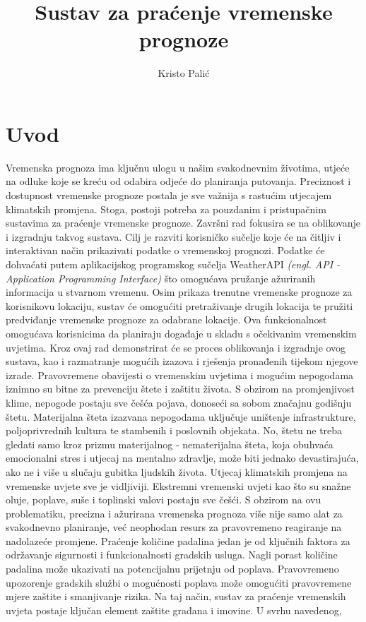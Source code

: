 \documentclass[times, utf8, zavrsni]{fer}
\begin{document}

\title{Sustav za praćenje vremenske prognoze}

\author{Kristo Palić}


\zahvala

\tableofcontents

\chapter{Uvod}
Vremenska prognoza ima ključnu ulogu u našim svakodnevnim životima, utjeće na odluke koje se kreću od odabira odjeće do planiranja putovanja. Preciznost i dostupnost vremenske prognoze postala je sve važnija s rastućim utjecajem klimatskih promjena. Stoga, postoji potreba za pouzdanim i pristupačnim sustavima za praćenje vremenske prognoze. Završni rad fokusira se na oblikovanje i izgradnju takvog sustava. Cilj je razviti korisničko sučelje koje će na čitljiv i interaktivan način prikazivati podatke o vremenskoj prognozi. Podatke će dohvaćati putem aplikacijskog programskog sučelja WeatherAPI \cite{weather_API} \textit{(engl. API - Application Programming Interface)} što omogućava pružanje ažuriranih informacija u stvarnom vremenu. Osim prikaza trenutne vremenske prognoze za korisnikovu lokaciju, sustav će omogućiti pretraživanje drugih lokacija te pružiti predviđanje vremenske prognoze za odabrane lokacije. Ova funkcionalnost omogućava korisnicima da planiraju događaje u skladu s očekivanim vremenskim uvjetima. Kroz ovaj rad demonstrirat će se proces oblikovanja i izgradnje ovog sustava, kao i razmatranje mogućih izazova i rješenja pronađenih tijekom njegove izrade. Pravovremene obavijesti o vremenskim uvjetima i mogućim nepogodama iznimno su bitne za prevenciju štete i zaštitu života. S obzirom na promjenjivost klime, nepogode postaju sve češća pojava, donoseći sa sobom značajnu godišnju štetu. Materijalna šteta izazvana nepogodama uključuje uništenje infrastrukture, poljoprivrednih kultura te stambenih i poslovnih objekata. No, štetu ne treba gledati samo kroz prizmu materijalnog - nematerijalna šteta, koja obuhvaća emocionalni stres i utjecaj na mentalno zdravlje, može biti jednako devastirajuća, ako ne i više u slučaju gubitka ljudskih života. Utjecaj klimatskih promjena na vremenske uvjete sve je vidljiviji. Ekstremni vremenski uvjeti kao što su snažne oluje, poplave, suše i toplinski valovi postaju sve češći. S obzirom na ovu problematiku, precizna i ažurirana vremenska prognoza više nije samo alat za svakodnevno planiranje, već neophodan resurs za pravovremeno reagiranje na nadolazeće promjene. Praćenje količine padalina jedan je od ključnih faktora za održavanje sigurnosti i funkcionalnosti gradskih usluga. Nagli porast količine padalina može ukazivati na potencijalnu prijetnju od poplava. Pravovremeno upozorenje gradskih službi o mogućnosti poplava može omogućiti pravovremene mjere zaštite i smanjivanje rizika. Na taj način, sustav za praćenje vremenskih uvjeta postaje ključan element zaštite građana i imovine. U svrhu navedenog, 
\end{document}
